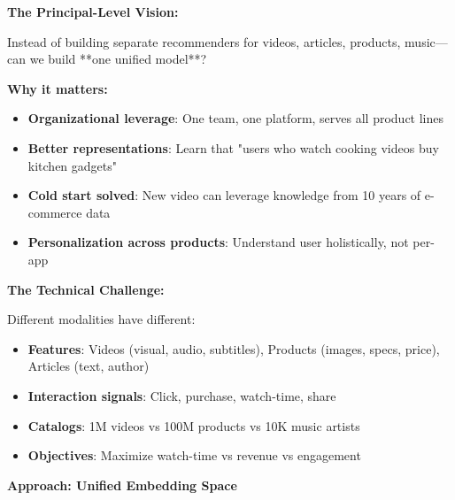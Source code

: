 \documentclass[10pt]{article}
\begin{document}
\textbf{The Principal-Level Vision:}

Instead of building separate recommenders for videos, articles, products, music—can we build **one unified model**?

\textbf{Why it matters:}
\begin{itemize}
\item \textbf{Organizational leverage}: One team, one platform, serves all product lines
\item \textbf{Better representations}: Learn that "users who watch cooking videos buy kitchen gadgets"
\item \textbf{Cold start solved}: New video can leverage knowledge from 10 years of e-commerce data
\item \textbf{Personalization across products}: Understand user holistically, not per-app
\end{itemize}

\textbf{The Technical Challenge:}

Different modalities have different:
\begin{itemize}
\item \textbf{Features}: Videos (visual, audio, subtitles), Products (images, specs, price), Articles (text, author)
\item \textbf{Interaction signals}: Click, purchase, watch-time, share
\item \textbf{Catalogs}: 1M videos vs 100M products vs 10K music artists
\item \textbf{Objectives}: Maximize watch-time vs revenue vs engagement
\end{itemize}

\textbf{Approach: Unified Embedding Space}
\end{document}

